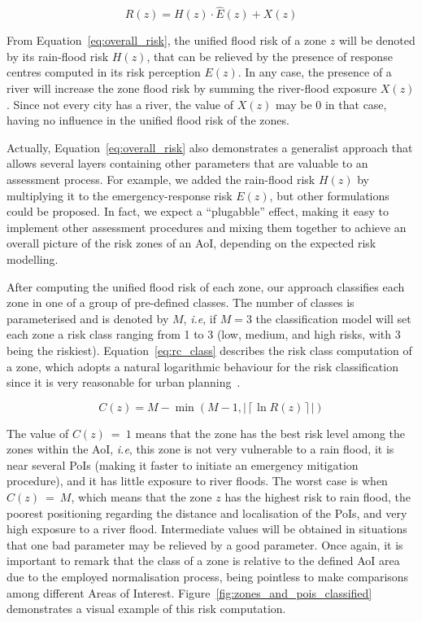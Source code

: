 \begin{refsection}
\begin{equation}
    \label{eq:overall_risk}
    R(z) = H(z) \cdot \widehat{E}(z) + X(z)
\end{equation}

From Equation~\ref{eq:overall_risk}, the unified flood risk of a zone $z$ will be denoted by its rain-flood risk $H(z)$, that can be relieved by the presence of response centres computed in its risk perception $E(z)$. In any case, the presence of a river will increase the zone flood risk by summing the river-flood exposure $X(z)$. Since not every city has a river, the value of $X(z)$ may be 0 in that case, having no influence in the unified flood risk of the zones.

Actually, Equation~\ref{eq:overall_risk} also demonstrates a generalist approach that allows several layers containing other parameters that are valuable to an assessment process. For example, we added the rain-flood risk $H(z)$ by multiplying it to the emergency-response risk $E(z)$, but other formulations could be proposed. In fact, we expect a ``plugabble'' effect, making it easy to implement other assessment procedures and mixing them together to achieve an overall picture of the risk zones of an AoI, depending on the expected risk modelling.

After computing the unified flood risk of each zone, our approach classifies each zone in one of a group of pre-defined classes. The number of classes is parameterised and is denoted by $M$, \textit{i.e}, if $M = 3$ the classification model will set each zone a risk class ranging from 1 to 3 (low, medium, and high risks, with 3 being the riskiest). Equation~\ref{eq:rc_class} describes the risk class computation of a zone, which adopts a natural logarithmic behaviour for the risk classification since it is very reasonable for urban planning~\cite{log2,log3}.

\begin{equation}
    \label{eq:rc_class}
    C(z) = M - \min\left(M - 1, \left| \left\lceil \ln{R(z)} \right\rceil \right| \right)
\end{equation}

The value of $C(z)~=~1$ means that the zone has the best risk level among the zones within the AoI, \textit{i.e}, this zone is not very vulnerable to a rain flood, it is near several PoIs (making it faster to initiate an emergency mitigation procedure), and it has little exposure to river floods. The worst case is when $C(z)~=~M$, which means that the zone $z$ has the highest risk to rain flood, the poorest positioning regarding the distance and localisation of the PoIs, and very high exposure to a river flood. Intermediate values will be obtained in situations that one bad parameter may be relieved by a good parameter. Once again, it is important to remark that the class of a zone is relative to the defined AoI area due to the employed normalisation process, being pointless to make comparisons among different Areas of Interest. Figure~\ref{fig:zones_and_pois_classified} demonstrates a visual example of this risk computation. 


\end{refsection}
